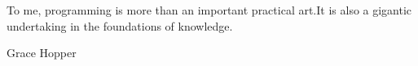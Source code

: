 \documentclass{report}
\begin{document}



\tableofcontents

\pagebreak

\renewcommand{\textflush}{flushright}
\setlength{\epigraphwidth}{0.5\textwidth}
\epigraph{To me, programming is more than an important practical art.\linebreak \linebreak It is also a gigantic undertaking in the foundations of knowledge.}{Grace Hopper}









\raggedright
{}


\listoflistings
{}

\listoffigures
{}

\pagebreak


\end{document}
